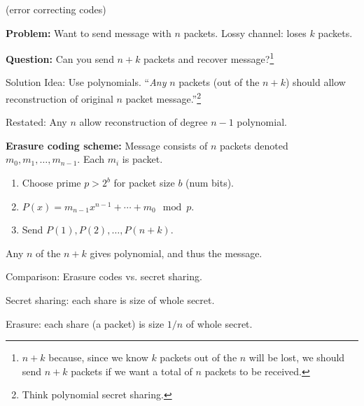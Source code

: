 \documentclass[12pt]{article}
\newcommand{\myspace}{\vspace{2\bigskipamount}}
\newcommand\p{\Needspace{12\baselineskip} \noindent}
\begin{document}
\myspace
\p {} (error correcting codes)
\begin{compactitem}
	\item \textbf{Problem:} Want to send message with $n$ packets. Lossy channel: loses $k$ packets. 
	\item \textbf{Question:} Can you send $n+k$ packets and recover message?\footnote{$n+k$ because, since we know $k$ packets out of the $n$ will be lost, we should send $n+k$ packets if we want a total of $n$ packets to be received.}
	\item Solution Idea: Use polynomials. ``\textit{Any} $n$ packets (out of the $n+k$) should allow reconstruction of original $n$ packet message.''\footnote{Think polynomial secret sharing.}
	\item Restated: Any $n$  allow reconstruction of degree $n-1$ polynomial.
	\item \textbf{Erasure coding scheme:} Message consists of $n$ packets denoted $m_0, m_1, \ldots, m_{n-1}$. Each $m_i$ is packet.
	\begin{enumerate}
		\item Choose prime $p > 2^b$ for packet size $b$ (num bits). 
		\item $P(x) = m_{n-1} x^{n-1} + \cdots + m_0 \mod{p}$. 
		\item Send $P(1), P(2), \ldots, P(n + k)$. 
	\end{enumerate}
	\item Any $n$ of the $n+k$ gives polynomial, and thus the message.
\end{compactitem}

\myspace
\p Comparison: Erasure codes vs. secret sharing.
\begin{compactitem}
	\item Secret sharing: each share is size of whole secret.
	\item Erasure: each share (a packet) is size $1/n$ of whole secret.
\end{compactitem}
\end{document}
